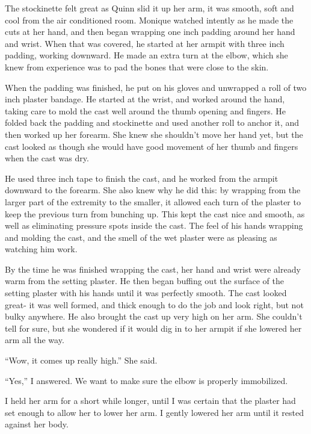 \begin{thought}
The stockinette felt great as Quinn slid it up her arm, it was smooth, soft and cool from
the air conditioned room. Monique watched intently as he made the cuts at her hand, and then
began wrapping one inch padding around her hand and wrist. When that was covered, he started at
her armpit with three inch padding, working downward. He made an extra turn at the elbow, which
she knew from experience was to pad the bones that were close to the skin.

When the padding was finished, he put on his gloves and unwrapped a roll of two inch
plaster bandage. He started at the wrist, and worked around the hand, taking care to mold the
cast well around the thumb opening and fingers. He folded back the padding and stockinette and
used another roll to anchor it, and then worked up her forearm. She knew she shouldn't move her
hand yet, but the cast looked as though she would have good movement of her thumb and fingers
when the cast was dry.

He used three inch tape to finish the cast, and he worked from the armpit downward to the
forearm. She also knew why he did this: by wrapping from the larger part of the extremity to the
smaller, it allowed each turn of the plaster to keep the previous turn from bunching up. This
kept the cast nice and smooth, as well as eliminating pressure spots inside the cast. The feel
of his hands wrapping and molding the cast, and the smell of the wet plaster were as pleasing as
watching him work.

By the time he was finished wrapping the cast, her hand and wrist were already warm from
the setting plaster. He then began buffing out the surface of the setting plaster with his hands
until it was perfectly smooth. The cast looked great- it was well formed, and thick enough to do
the job and look right, but not bulky anywhere. He also brought the cast up very high on her
arm. She couldn't tell for sure, but she wondered if it would dig in to her armpit if she
lowered her arm all the way.
\end{thought}

``Wow, it comes up really high.'' She said.

``Yes,'' I answered. We want to make sure the elbow is properly immobilized.

I held her arm for a short while longer, until I was certain that the plaster had set
enough to allow her to lower her arm. I gently lowered her arm until it rested against her body.

